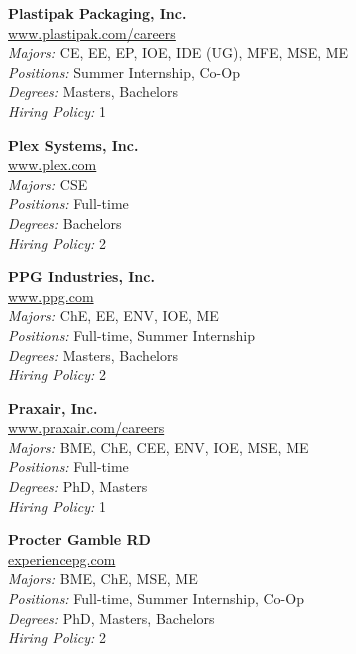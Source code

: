 \documentclass[twoside]{article}
\begin{document}
\begin{center}
\begin{multicols}{3}
\begin{minipage}{.9\columnwidth}{\Large\bf Plastipak Packaging, Inc. }\\
	\url{www.plastipak.com/careers}\\
	\emph{Majors:} CE, EE, EP, IOE, IDE (UG), MFE, MSE, ME\\
	\emph{Positions:} Summer Internship, Co-Op\\
	\emph{Degrees:} Masters, Bachelors\\
	\emph{Hiring Policy:} 1\\
\end{minipage}
 
\begin{minipage}{.9\columnwidth}{\Large\bf Plex Systems, Inc. }\\
	\url{www.plex.com}\\
	\emph{Majors:} CSE\\
	\emph{Positions:} Full-time\\
	\emph{Degrees:} Bachelors\\
	\emph{Hiring Policy:} 2\\
\end{minipage}
 
\begin{minipage}{.9\columnwidth}{\Large\bf PPG Industries, Inc. }\\
	\url{www.ppg.com}\\
	\emph{Majors:} ChE, EE, ENV, IOE, ME\\
	\emph{Positions:} Full-time, Summer Internship\\
	\emph{Degrees:} Masters, Bachelors\\
	\emph{Hiring Policy:} 2\\
\end{minipage}
 
\begin{minipage}{.9\columnwidth}{\Large\bf Praxair, Inc. }\\
	\url{www.praxair.com/careers}\\
	\emph{Majors:} BME, ChE, CEE, ENV, IOE, MSE, ME\\
	\emph{Positions:} Full-time\\
	\emph{Degrees:} PhD, Masters\\
	\emph{Hiring Policy:} 1\\
\end{minipage}
 
\begin{minipage}{.9\columnwidth}{\Large\bf Procter Gamble RD }\\
	\url{experiencepg.com}\\
	\emph{Majors:} BME, ChE, MSE, ME\\
	\emph{Positions:} Full-time, Summer Internship, Co-Op\\
	\emph{Degrees:} PhD, Masters, Bachelors\\
	\emph{Hiring Policy:} 2\\
\end{minipage}
 

\end{multicols}
\end{center}
\end{document}
